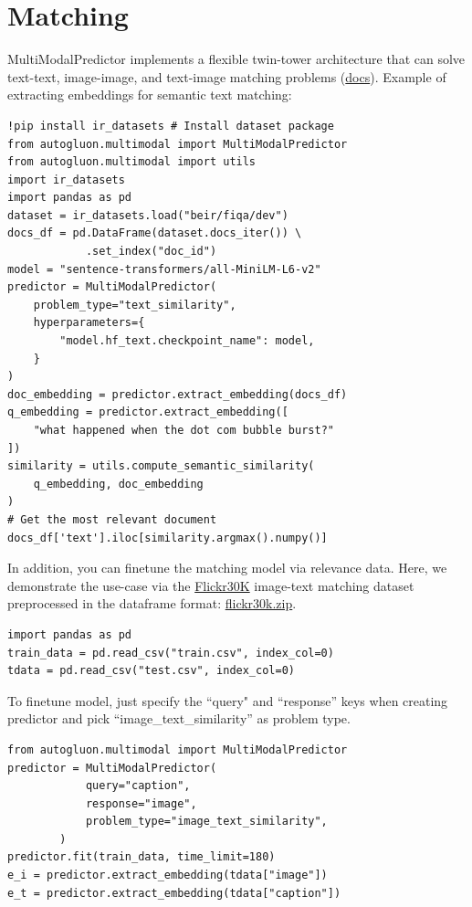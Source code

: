 \section*{Matching}
MultiModalPredictor implements a flexible twin-tower architecture that can solve text-text, image-image, and text-image matching problems (\href{https://auto.gluon.ai/stable/tutorials/multimodal/matching/index.html}{docs}). Example of extracting embeddings for semantic text matching:
\begin{verbatim}
!pip install ir_datasets # Install dataset package
from autogluon.multimodal import MultiModalPredictor
from autogluon.multimodal import utils
import ir_datasets
import pandas as pd
dataset = ir_datasets.load("beir/fiqa/dev")
docs_df = pd.DataFrame(dataset.docs_iter()) \
            .set_index("doc_id")
model = "sentence-transformers/all-MiniLM-L6-v2"
predictor = MultiModalPredictor(
    problem_type="text_similarity",
    hyperparameters={
        "model.hf_text.checkpoint_name": model,
    }
)
doc_embedding = predictor.extract_embedding(docs_df)
q_embedding = predictor.extract_embedding([
    "what happened when the dot com bubble burst?"
])
similarity = utils.compute_semantic_similarity(
    q_embedding, doc_embedding
)
# Get the most relevant document
docs_df['text'].iloc[similarity.argmax().numpy()]
\end{verbatim}

In addition, you can finetune the matching model via relevance data. Here, we demonstrate the use-case via the \href{https://paperswithcode.com/dataset/flickr30k}{Flickr30K} image-text matching dataset preprocessed in the dataframe format: \href{https://automl-mm-bench.s3.amazonaws.com/flickr30k.zip}{flickr30k.zip}.
\begin{verbatim}
import pandas as pd
train_data = pd.read_csv("train.csv", index_col=0)
tdata = pd.read_csv("test.csv", index_col=0)
\end{verbatim}

To finetune model, just specify the ``query" and ``response'' keys when creating predictor and pick ``image\_text\_similarity'' as problem type.
\begin{verbatim}
from autogluon.multimodal import MultiModalPredictor
predictor = MultiModalPredictor(
            query="caption",
            response="image",
            problem_type="image_text_similarity",
        )
predictor.fit(train_data, time_limit=180)
e_i = predictor.extract_embedding(tdata["image"])
e_t = predictor.extract_embedding(tdata["caption"])
\end{verbatim}

